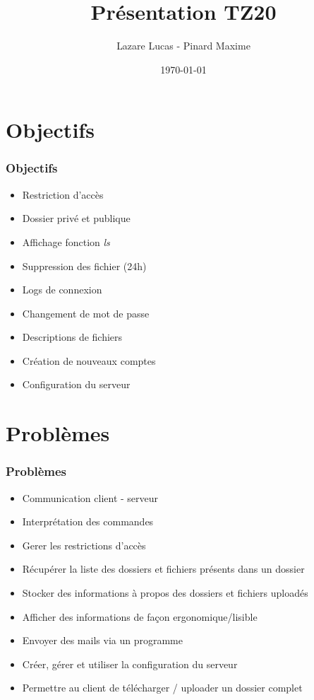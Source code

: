\documentclass[11pt]{beamer}
\author{Lazare Lucas - Pinard Maxime}
\title{Présentation TZ20}
\institute{UTBM}
\date{\today}
\begin{document}
\begin{frame}
	\titlepage{}
\end{frame}

\begin{frame}
	\tableofcontents{}
\end{frame}

\section{Objectifs}

	\begin{frame}
		\frametitle{Objectifs}
		\begin{itemize}
			\item{} Restriction d'accès
			\item{} Dossier privé et publique
			\item{} Affichage fonction \textit{ls}
			\item{} Suppression des fichier (24h)
			\item{} Logs de connexion
			\item{} Changement de mot de passe
			\item{} Descriptions de fichiers
			\item{} Création de nouveaux comptes
			\item{} Configuration du serveur
		\end{itemize}
	\end{frame}

\section{Problèmes}

	\begin{frame}
		\frametitle{Problèmes}
		\begin{itemize}
			\item{} Communication client - serveur
			\item{} Interprétation des commandes
			\item{} Gerer les restrictions d'accès
			\item{} Récupérer la liste des dossiers et fichiers présents dans un dossier
			\item{} Stocker des informations à propos des dossiers et fichiers uploadés
			\item{} Afficher des informations de façon ergonomique/lisible
			\item{} Envoyer des mails via un programme
			\item{} Créer, gérer et utiliser la configuration du serveur
			\item{} Permettre au client de télécharger / uploader un dossier complet
		\end{itemize}
	\end{frame}
\end{document}
